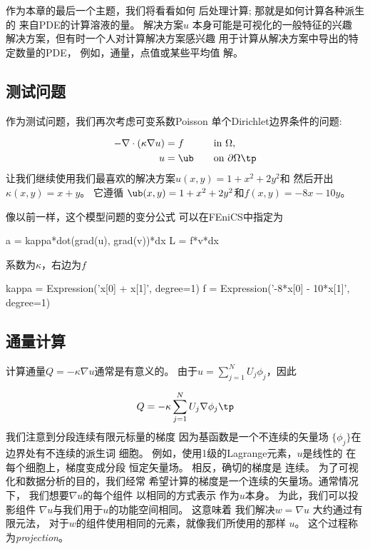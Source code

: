 
作为本章的最后一个主题，我们将看看如何
后处理计算; 那就是如何计算各种派生的
来自PDE的计算溶液的量。 解决方案$u$
本身可能是可视化的一般特征的兴趣
解决方案，但有时一个人对计算解决方案感兴趣
用于计算从解决方案中导出的特定数量的PDE，
例如，通量，点值或某些平均值
解。

\subsection{测试问题}

作为测试问题，我们再次考虑可变系数Poisson
单个Dirichlet边界条件的问题:

\begin{alignat}{2}
    - \nabla\cdot(\kappa\nabla u) &= f \quad &&\mbox{in } \Omega,
\label{ch:poisson0:2D:varcoeff} \\
    u &= \ub \quad &&\mbox{on}\  \partial\Omega\tp
\end{alignat}
让我们继续使用我们最喜欢的解决方案$u(x,y)=1+x^2+2y^2$和
然后开出$\kappa(x,y)=x+y$。 它遵循
$\ub(x,y)=1+x^2+2y^2$和$f(x,y)=-8x-10y$。

像以前一样，这个模型问题的变分公式
可以在FEniCS中指定为

\begin{python}
a = kappa*dot(grad(u), grad(v))*dx
L = f*v*dx
\end{python}
系数为$\kappa$，右边为$f$

\begin{python}
kappa = Expression('x[0] + x[1]', degree=1)
f = Expression('-8*x[0] - 10*x[1]', degree=1)
\end{python}

\subsection{通量计算}
\label{ch:poisson0:gradu}

计算通量$Q=-\kappa\nabla u$通常是有意义的。
由于$u=\sum_{j=1}^N U_j \phi_j$，因此

\begin{equation*}
Q = -\kappa\sum_{j=1}^N U_j \nabla \phi_j\tp
\end{equation*}
我们注意到分段连续有限元标量的梯度
因为基函数是一个不连续的矢量场
$\{\phi_j\}$在边界处有不连续的派生词
细胞。 例如，使用1级的Lagrange元素，$u$是线性的
在每个细胞上，梯度变成分段
恒定矢量场。 相反，确切的梯度是
连续。 为了可视化和数据分析的目的，我们经常
希望计算的梯度是一个连续的矢量场。通常情况下，
我们想要$\nabla u$的每个组件
以相同的方式表示
作为$u$本身。 为此，我们可以投影组件
$\nabla u$与我们用于$u$的功能空间相同。 这意味着
我们解决$w=\nabla u$
大约通过有限元法，
对于$w$的组件使用相同的元素，就像我们所使用的那样
$u$。 这个过程称为\emph{projection}。

